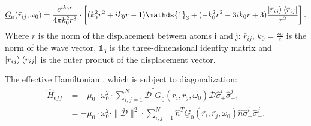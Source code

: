 \documentclass{article}
\begin{document}
\begin{equation}\label{eq:Greens}
    \underline{G}_0 (\bar{r}_{ij}, \omega_0) = \frac{e^{ik_0r}}{4\pi k_0^2 r^3} \cdot \left[ (k_0^2r^2 + ik_0r - 1) \mathds{1}_3 + (-k_0^2 r^2 -3ik_0r + 3) \frac{\ket{\bar{r}_{ij}}\bra{\bar{r}_{ij}}}{r^2} \right].
\end{equation}
Where $r$ is the norm of the displacement between atoms i and j: $\bar{r}_{ij}$, $k_0=\frac{\omega_0}{c}$ is the norm of the wave vector, $\mathds{1}_3$ is the three-dimensional identity matrix and $\ket{\bar{r}_{ij}}\bra{\bar{r}_{ij}}$ is the outer product of the displacement vector. 

The effective Hamiltonian \cite[Equation 5]{Asenjo}, which is subject to diagonalization:
\begin{equation}\label{eq:Heff}
    \begin{split}
        \hat{H}_{eff} &= - \mu_0 \cdot \omega_0^2 \cdot \sum_{i,j = 1}^N \bar{\mathscr{D}}^\dagger \underline{G}_0(\bar{r_i}, \bar{r_j}, \omega_0) \bar{\mathscr{D}} \hat{\sigma}_+^i \hat{\sigma}_-^j, \\
        &=- \mu_0 \cdot \omega_0^2 \cdot \|\bar{\mathscr{D}}\|^2 \cdot \sum_{i,j = 1}^N \hat{n}^T \underline{G}_0(\bar{r_i}, \bar{r_j}, \omega_0) \hat{n} \hat{\sigma}_+^i \hat{\sigma}_-^j. \\
    \end{split}
\end{equation}
\end{document}
